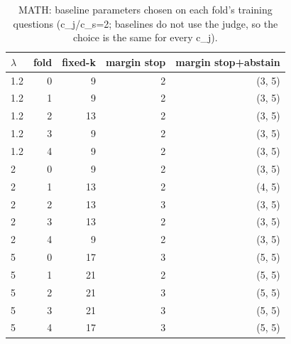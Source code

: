 \begin{table}[t]
\centering
\small
\caption{MATH: baseline parameters chosen on each fold's training questions (c\_j/c\_s=2; baselines do not use the judge, so the choice is the same for every c\_j).}
\label{tab:tuned_params_math}
\begin{tabular}{lrrrr}
\toprule
$\lambda$ & fold & fixed-k & margin stop & margin stop+abstain \\
\midrule
1.2 & 0 & 9 & 2 & (3, 5) \\
1.2 & 1 & 9 & 2 & (3, 5) \\
1.2 & 2 & 13 & 2 & (3, 5) \\
1.2 & 3 & 9 & 2 & (3, 5) \\
1.2 & 4 & 9 & 2 & (3, 5) \\
2 & 0 & 9 & 2 & (3, 5) \\
2 & 1 & 13 & 2 & (4, 5) \\
2 & 2 & 13 & 3 & (3, 5) \\
2 & 3 & 13 & 2 & (3, 5) \\
2 & 4 & 9 & 2 & (3, 5) \\
5 & 0 & 17 & 3 & (5, 5) \\
5 & 1 & 21 & 2 & (5, 5) \\
5 & 2 & 21 & 3 & (5, 5) \\
5 & 3 & 21 & 3 & (5, 5) \\
5 & 4 & 17 & 3 & (5, 5) \\
\bottomrule
\end{tabular}
\end{table}
